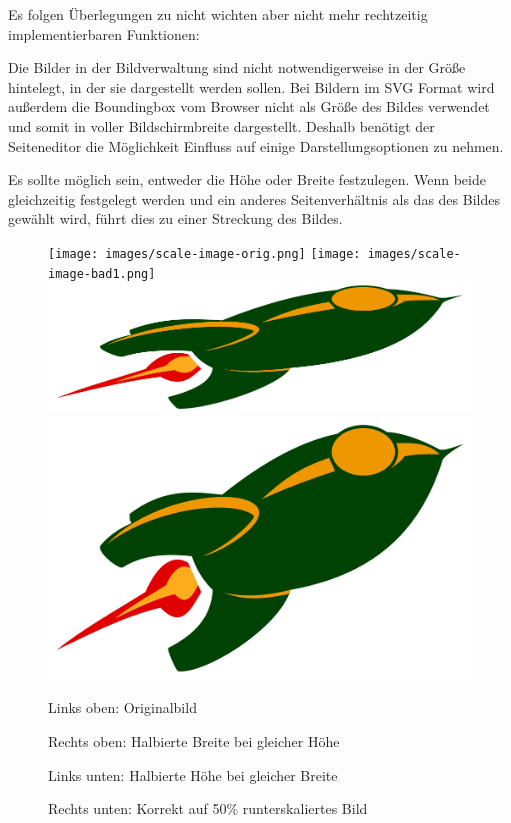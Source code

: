Es folgen Überlegungen zu nicht wichten aber nicht mehr rechtzeitig
implementierbaren Funktionen:

Die Bilder in der Bildverwaltung sind nicht notwendigerweise in der Größe
hintelegt, in der sie dargestellt werden sollen. Bei Bildern im SVG Format
wird außerdem die Boundingbox vom Browser nicht als Größe des Bildes verwendet
und somit in voller Bildschirmbreite dargestellt. Deshalb benötigt der
Seiteneditor die Möglichkeit Einfluss auf einige Darstellungsoptionen zu nehmen.

Es sollte möglich sein, entweder die Höhe oder Breite festzulegen. Wenn beide
gleichzeitig festgelegt werden und ein anderes Seitenverhältnis als das des
Bildes gewählt wird, führt dies zu einer Streckung des Bildes.

\begin{figure}
  \texttt{[image: images/scale-image-orig.png]}
  \texttt{[image: images/scale-image-bad1.png]}
  \includegraphics[width=\columnwidth/100*66]{images/scale-image-bad2.png}
  \includegraphics[width=\columnwidth/100*33]{images/scale-image-good.png}

  Links oben: Originalbild

  Rechts oben: Halbierte Breite bei gleicher Höhe

  Links unten: Halbierte Höhe bei gleicher Breite

  Rechts unten: Korrekt auf 50\% runterskaliertes Bild
\end{figure}

